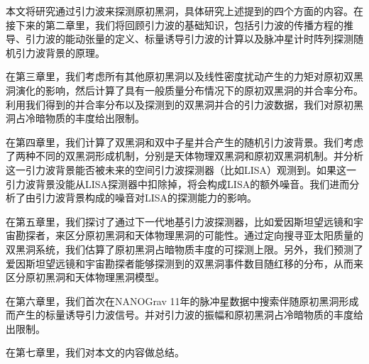 本文将研究通过引力波来探测原初黑洞，具体研究上述提到的四个方面的内容。在接下来的第二章里，我们将回顾引力波的基础知识，包括引力波的传播方程的推导、引力波的能动张量的定义、标量诱导引力波的计算以及脉冲星计时阵列探测随机引力波背景的原理。

在第三章里，我们考虑所有其他原初黑洞以及线性密度扰动产生的力矩对原初双黑洞演化的影响，然后计算了具有一般质量分布情况下的原初双黑洞的并合率分布。利用我们得到的并合率分布以及\lvc 探测到的双黑洞并合的引力波数据，我们对原初黑洞占冷暗物质的丰度给出限制。

在第四章里，我们计算了双黑洞和双中子星并合产生的随机引力波背景。我们考虑了两种不同的双黑洞形成机制，分别是天体物理双黑洞和原初双黑洞机制。并分析这一引力波背景能否被未来的空间引力波探测器（比如LISA）观测到。如果这一引力波背景没能从LISA探测器中扣除掉，将会构成LISA的额外噪音。我们进而分析了由引力波背景构成的噪音对LISA的探测能力的影响。

在第五章里，我们探讨了通过下一代地基引力波探测器，比如爱因斯坦望远镜和宇宙勘探者，来区分原初黑洞和天体物理黑洞的可能性。通过定向搜寻亚太阳质量的双黑洞系统，我们估算了原初黑洞占暗物质丰度的可探测上限。另外，我们预测了爱因斯坦望远镜和宇宙勘探者能够探测到的双黑洞事件数目随红移的分布，从而来区分原初黑洞和天体物理黑洞模型。

在第六章里，我们首次在NANOGrav 11年的脉冲星数据中搜索伴随原初黑洞形成而产生的标量诱导引力波信号。并对引力波的振幅和原初黑洞占冷暗物质的丰度给出限制。

在第七章里，我们对本文的内容做总结。
